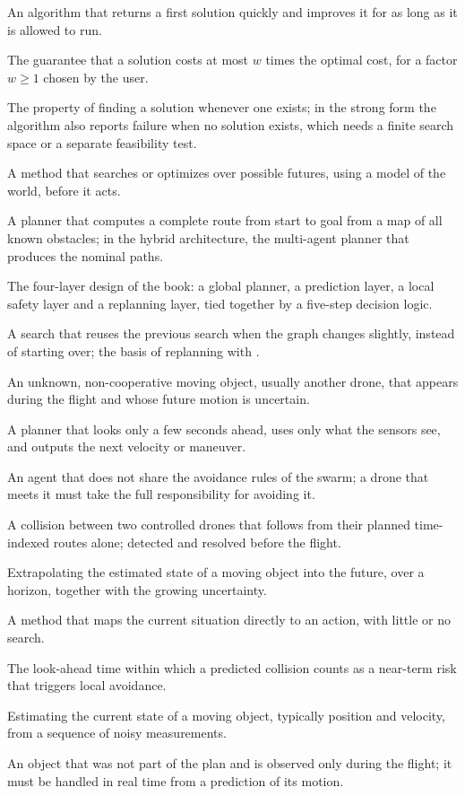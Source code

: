 \item[Anytime algorithm] An algorithm that returns a first solution quickly and improves it for as long as it is allowed to run.
\item[Bounded suboptimality] The guarantee that a solution costs at most $w$ times the optimal cost, for a factor $w\ge 1$ chosen by the user.
\item[Completeness] The property of finding a solution whenever one exists; in the strong form the algorithm also reports failure when no solution exists, which needs a finite search space or a separate feasibility test.
\item[Deliberative method] A method that searches or optimizes over possible futures, using a model of the world, before it acts.
\item[Global planner] A planner that computes a complete route from start to goal from a map of all known obstacles; in the hybrid architecture, the multi-agent planner that produces the nominal paths.
\item[Hybrid architecture] The four-layer design of the book: a global planner, a prediction layer, a local safety layer and a replanning layer, tied together by a five-step decision logic.
\item[Incremental search] A search that reuses the previous search when the graph changes slightly, instead of starting over; the basis of replanning with \dstarlite.
\item[Intruder] An unknown, non-cooperative moving object, usually another drone, that appears during the flight and whose future motion is uncertain.
\item[Local planner] A planner that looks only a few seconds ahead, uses only what the sensors see, and outputs the next velocity or maneuver.
\item[Non-cooperative agent] An agent that does not share the avoidance rules of the swarm; a drone that meets it must take the full responsibility for avoiding it.
\item[Planned conflict] A collision between two controlled drones that follows from their planned time-indexed routes alone; detected and resolved before the flight.
\item[Prediction] Extrapolating the estimated state of a moving object into the future, over a horizon, together with the growing uncertainty.
\item[Reactive method] A method that maps the current situation directly to an action, with little or no search.
\item[Safety horizon] The look-ahead time within which a predicted collision counts as a near-term risk that triggers local avoidance.
\item[Tracking] Estimating the current state of a moving object, typically position and velocity, from a sequence of noisy measurements.
\item[Unexpected obstacle] An object that was not part of the plan and is observed only during the flight; it must be handled in real time from a prediction of its motion.
